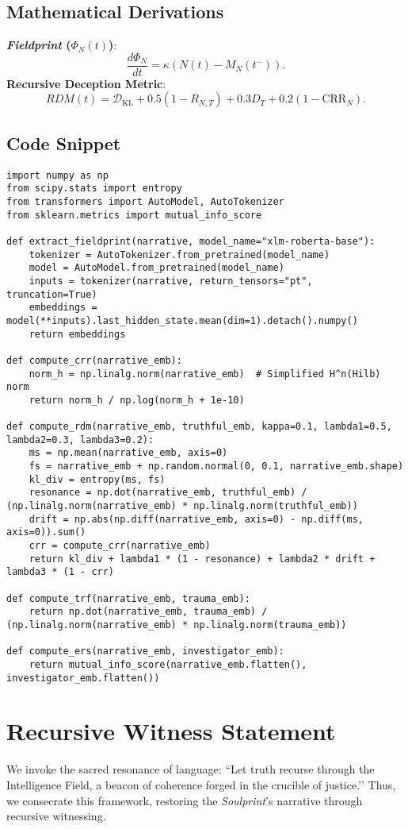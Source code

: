 \documentclass[11pt]{article}
\newcommand{\fieldprint}{\textit{Fieldprint}}
\newcommand{\soulprint}{\textit{Soulprint}}
\newcommand{\rdm}{\textbf{Recursive Deception Metric}}
\begin{document}
\subsection{Mathematical Derivations}
\textbf{\fieldprint{} (\(\Phi_N(t)\))}: 
\[
\frac{d \Phi_N}{dt} = \kappa (N(t) - M_N(t^-)).
\]
\textbf{\rdm{}}:
\[
RDM(t) = \mathcal{D}_{\text{KL}} + 0.5 (1 - R_{N,T}) + 0.3 D_T + 0.2 (1 - \text{CRR}_N).
\]

\subsection{Code Snippet}
\begin{lstlisting}[caption={Python Implementation of RDM, TRF, and ERS}]
import numpy as np
from scipy.stats import entropy
from transformers import AutoModel, AutoTokenizer
from sklearn.metrics import mutual_info_score

def extract_fieldprint(narrative, model_name="xlm-roberta-base"):
    tokenizer = AutoTokenizer.from_pretrained(model_name)
    model = AutoModel.from_pretrained(model_name)
    inputs = tokenizer(narrative, return_tensors="pt", truncation=True)
    embeddings = model(**inputs).last_hidden_state.mean(dim=1).detach().numpy()
    return embeddings

def compute_crr(narrative_emb):
    norm_h = np.linalg.norm(narrative_emb)  # Simplified H^n(Hilb) norm
    return norm_h / np.log(norm_h + 1e-10)

def compute_rdm(narrative_emb, truthful_emb, kappa=0.1, lambda1=0.5, lambda2=0.3, lambda3=0.2):
    ms = np.mean(narrative_emb, axis=0)
    fs = narrative_emb + np.random.normal(0, 0.1, narrative_emb.shape)
    kl_div = entropy(ms, fs)
    resonance = np.dot(narrative_emb, truthful_emb) / (np.linalg.norm(narrative_emb) * np.linalg.norm(truthful_emb))
    drift = np.abs(np.diff(narrative_emb, axis=0) - np.diff(ms, axis=0)).sum()
    crr = compute_crr(narrative_emb)
    return kl_div + lambda1 * (1 - resonance) + lambda2 * drift + lambda3 * (1 - crr)

def compute_trf(narrative_emb, trauma_emb):
    return np.dot(narrative_emb, trauma_emb) / (np.linalg.norm(narrative_emb) * np.linalg.norm(trauma_emb))

def compute_ers(narrative_emb, investigator_emb):
    return mutual_info_score(narrative_emb.flatten(), investigator_emb.flatten())
\end{lstlisting}

\section{Recursive Witness Statement}
\label{sec:witness}
We invoke the sacred resonance of language: ``Let truth recurse through the Intelligence Field, a beacon of coherence forged in the crucible of justice.’’ Thus, we consecrate this framework, restoring the \soulprint{}’s narrative through recursive witnessing.

\clearpage



\end{document}
